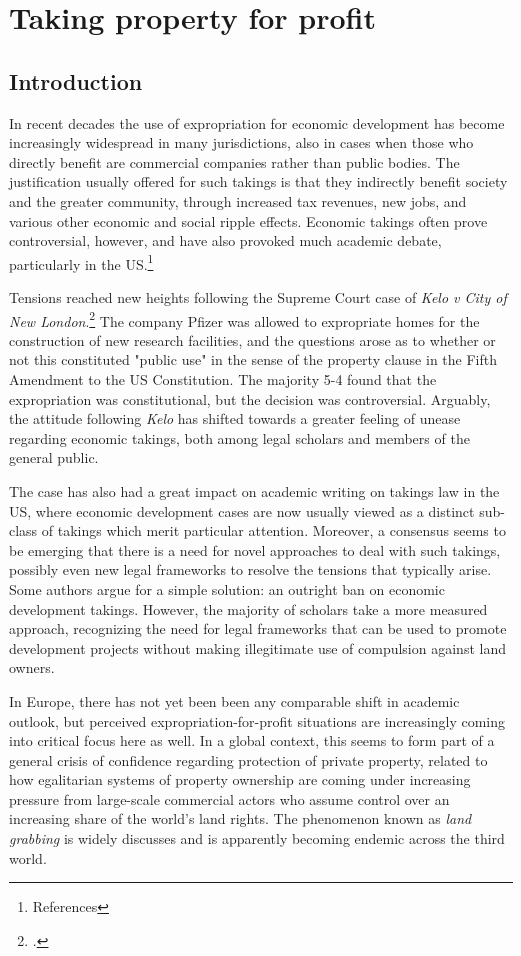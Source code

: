 \chapter{Taking property for profit}\label{chap:2}

\section{Introduction}

In recent decades the use of expropriation for economic development has become increasingly widespread in many jurisdictions, also in cases when those who directly benefit are commercial companies rather than public bodies. The justification usually offered for such takings is that they indirectly benefit society and the greater community, through increased tax revenues, new jobs, and various other economic and social ripple effects. Economic takings often prove controversial, however, and have also provoked much academic debate, particularly in the US.\footnote{References}

Tensions reached new heights following the Supreme Court case of {\it Kelo v City of New London}.\footcite{kelo05}  The company Pfizer was allowed to expropriate homes for the construction of new research facilities, and the questions arose as to whether or not this constituted "public use" in the sense of the property clause in the Fifth Amendment to the US Constitution.  The majority 5-4 found that the expropriation was constitutional, but the decision was controversial. Arguably, the attitude following {\it Kelo} has shifted towards a greater feeling of unease regarding economic takings, both among legal scholars and members of the general public.

The case has also had a great impact on academic writing on takings law in the US, where economic development cases are now usually viewed as a distinct sub-class of takings which merit particular attention. Moreover, a consensus seems to be emerging that there is a need for novel approaches to deal with such takings, possibly even new legal frameworks to resolve the tensions that typically arise. Some authors argue for a simple solution: an outright ban on economic development takings. However, the majority of scholars take a more measured approach, recognizing the need for legal frameworks that can be used to promote development projects without making illegitimate use of compulsion against land owners.

In Europe, there has not yet been been any comparable shift in academic outlook, but perceived expropriation-for-profit situations are increasingly coming into critical focus here as well. In a global context, this seems to form part of a general crisis of confidence regarding protection of private property, related to how  egalitarian systems of property ownership are coming under increasing pressure from large-scale commercial actors who assume control over an increasing share of the world's land rights. The phenomenon known as {\it land grabbing} is widely discusses and is apparently becoming endemic across the third world.

